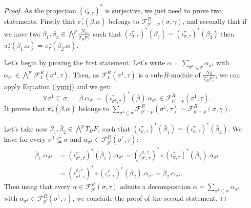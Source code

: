 \documentclass{article}
\begin{document}
\begin{proof}
    As the projection $(\iota_{\sigma,\tau}^{\tau})^*$ is surjective, we just need to prove two statements. Firstly that $\pi_{\tau}^{\gamma}(\overline{\beta}.\alpha)$ belongs to $\mathcal{F}_{p'-p}^R(\sigma,\gamma)$, and secondly that if we have two $\overline{\beta}_1, \overline{\beta}_2  \in \bigwedge^p\frac{N_R}{T_RF_{\tau}^{\perp}}$ such that $(\iota_{\sigma,\tau}^{\tau})^*(\overline{\beta}_1) = (\iota_{\sigma,\tau}^{\tau})^*(\overline{\beta}_2)$ then $\pi_{\tau}^{\gamma}(\overline{\beta}_1.\alpha) = \pi_{\tau}^{\gamma}(\overline{\beta}_2.\alpha)$.

    Let's begin by proving the first statement. Let's write $\alpha = \sum_{\sigma^1 \subseteq \sigma} \alpha_{\sigma^1}$ with $\alpha_{\sigma^1} \in \bigwedge^{p'} \mathcal{F}_{1}^R(\sigma^1,\tau)$. Then, as $\mathcal{F}_{1}^R(\sigma^1,\tau)$ is a sub-$R$-module of $\frac{N_R}{T_RF_{\tau}^{\perp}}$, we can apply Equation (\ref{yutr}) and we get:
    \begin{equation*}
        \forall \sigma^1 \subseteq \sigma,~~~~ ~~ \overline{\beta}.\alpha_{\sigma^1} = (\iota_{\sigma^1,\tau}^{\tau})^*(\overline{\beta}).\alpha_{\sigma^1} \in \mathcal{F}_{p'-p}^R(\sigma^1,\tau).
    \end{equation*}
    It proves that $\pi_{\tau}^{\gamma}(\overline{\beta}.\alpha)$ belongs to $\sum_{\sigma^1 \subseteq \sigma} \mathcal{F}_{p'-p}^R(\sigma^1,\tau) = \mathcal{F}_{p'-p}^R(\sigma,\gamma)$.

    Let's take now $\overline{\beta}_1, \overline{\beta}_2  \in \bigwedge^{p}T_RF_\tau$ such that $(\iota_{\sigma,\tau}^{\tau})^*(\overline{\beta}_1) = (\iota_{\sigma,\tau}^{\tau})^*(\overline{\beta}_2)$. We have for every $\sigma^1 \subseteq\sigma$ and $\alpha_{\sigma^1} \in \mathcal{F}_{p'}^R(\sigma^1,\tau)$:
    \begin{align*}
        \overline{\beta}_1 .\alpha_{\sigma^1} &= (\iota_{\sigma^1,\tau}^{\tau})^*(\overline{\beta}_1).\alpha_{\sigma^1} = (\iota_{\sigma^1,\tau}^{\sigma,\tau})^*\circ (\iota_{\sigma,\tau}^{\tau})^*(\overline{\beta}_1).\alpha_{\sigma^1} \\&= (\iota_{\sigma^1,\tau}^{\sigma,\tau})^*\circ (\iota_{\sigma,\tau}^{\tau})^*(\overline{\beta}_2).\alpha_{\sigma^1} = \overline{\beta}_2 .\alpha_{\sigma^1}.
    \end{align*}
    Then using that every $\alpha \in \mathcal{F}_{p'}^R(\sigma,\tau)$ admits a decomposition $\alpha = \sum_{\sigma^1 \subseteq \sigma} \alpha_{\sigma^1}$ with $\alpha_{\sigma^1} \in \mathcal{F}_{p'}^R(\sigma^1,\tau)$, we conclude the proof of the second statement.
\end{proof}
\end{document}
